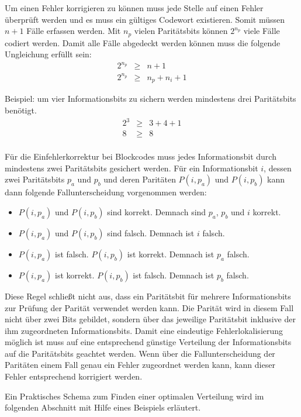 Um einen Fehler korrigieren zu können muss jede Stelle auf einen Fehler überprüft werden und es muss ein gültiges Codewort existieren. Somit müssen $n+1$ Fälle erfassen werden. Mit $n_p$ vielen Paritätsbits können $2^{n_p}$ viele Fälle codiert werden. Damit alle Fälle abgedeckt werden können muss die folgende Ungleichung erfüllt sein:
\begin{eqnarray*}
2^{n_p} &\ge& n + 1 \\
2^{n_p} &\ge& n_p + n_i + 1
\end{eqnarray*}

Beispiel: um vier Informationsbits zu sichern werden mindestens drei Paritätsbits benötigt.
\begin{eqnarray*}
2^{3} &\ge& 3 + 4 + 1 \\
8 &\ge& 8 \\
\end{eqnarray*}

Für die Einfehlerkorrektur bei Blockcodes muss jedes Informationsbit durch mindestens zwei Paritätsbits gesichert werden. Für ein Informationsbit $i$, dessen zwei Paritätsbits $p_a$ und $p_b$ und deren Paritäten $P(i, p_a)$ und $P(i, p_b)$ kann dann folgende Fallunterscheidung vorgenommen werden:
\begin{itemize}
\item
	$P(i, p_a)$ und $P(i, p_b)$ sind korrekt. Demnach sind $p_a$, $p_b$ und $i$ korrekt.
\item
	$P(i, p_a)$ und $P(i, p_b)$ sind falsch. Demnach ist $i$ falsch.
\item
	$P(i, p_a)$ ist falsch. $P(i, p_b)$ ist korrekt. Demnach ist $p_a$ falsch.
\item
	$P(i, p_a)$ ist korrekt. $P(i, p_b)$ ist falsch. Demnach ist $p_b$ falsch.
\end{itemize}
Diese Regel schließt nicht aus, dass ein Paritätsbit für mehrere Informationsbits zur Prüfung der Parität verwendet werden kann. Die Parität wird in diesem Fall nicht über zwei Bits gebildet, sondern über das jeweilige Paritätsbit inklusive der ihm zugeordneten Informationsbits. Damit eine eindeutige Fehlerlokalisierung möglich ist muss auf eine entsprechend günstige Verteilung der Informationsbits auf die Paritätsbits geachtet werden. Wenn über die Fallunterscheidung der Paritäten einem Fall genau ein Fehler zugeordnet werden kann, kann dieser Fehler entsprechend korrigiert werden.

Ein Praktisches Schema zum Finden einer optimalen Verteilung wird im folgenden Abschnitt mit Hilfe eines Beispiels erläutert.

